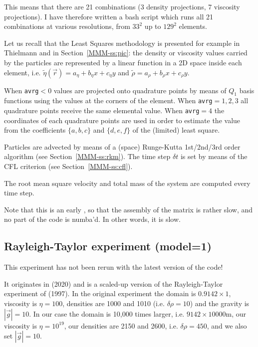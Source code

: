 This means that there are 21 combinations (3 density projections, 7 viscosity projections).
I have therefore written a bash script which runs all 21 combinations at various resolutions, 
from $33^2$ up to $129^2$ elements.

Let us recall that the Least Squares methodology is presented for example in 
Thielmann \etal \cite{thmk14} and in Section~\ref{MMM-ss:pic}:
the density or viscosity values carried by the particles are represented by a linear 
function in a 2D space inside each 
element, i.e. $\tilde{\eta}({\vec r}) = a_\eta + b_\eta x+c_\eta y$ and $\tilde{\rho}=a_\rho +b_\rho x+c_\rho y$.

When {\tt avrg}$<0$ values are projected onto quadrature points by means 
of $Q_1$ basis functions using the values at the corners of the element.
When {\tt avrg}$=1,2,3$ all quadrature points receive the same elemental value. 
When {\tt avrg}$=4$ the coordinates of each quadrature points are used in order to 
estimate the value from the coefficients $\{a,b,c\}$ and $\{d,e,f\}$ 
of the (limited) least square.


Particles are advected by means of a (space) Runge-Kutta 1st/2nd/3rd order algorithm (see
Section~\ref{MMM-ss:rkm}). The time step $\delta t$ is set by means of the CFL criterion (see
Section~\ref{MMM-ss:cfl}).

The root mean square velocity and total mass of the system are computed every time step.

Note that this is an early \stone, so that the assembly of the matrix is rather slow, 
and no part of the code is numba'd. In other words, it is slow.

\subsection*{Rayleigh-Taylor experiment (model=1)} 

{\color{red} This experiment has not been rerun with the latest version of the code!}

It originates in \textcite{sctc20} (2020) and is a scaled-up version of the 
Rayleigh-Taylor experiment of \textcite{vaks97} (1997).
In the original experiment the domain is $0.9142\times1$, viscosity is $\eta=100$, 
densities are 1000 and 1010 (i.e. $\delta \rho=10$) and the gravity is $|\vec{g}|=10$.
In our case the domain is 10,000 times larger, i.e. $9142\times10000$m, 
our viscosity is $\eta=10^{19}$, our densities are 2150 and 2600, i.e. $\delta\rho = 450$, 
and we also set $|\vec{g}|=10$.

